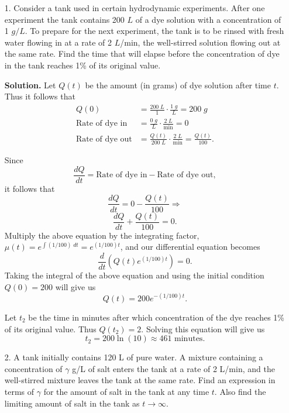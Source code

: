 \documentclass[9pt]{article}
\begin{document}
\begin{enumerate}
   \item[1.]   Consider a tank used in certain hydrodynamic experiments. After
               one experiment the tank contains 200 $L$ of a dye solution with a
               concentration of 1 $g/L$. To prepare for the next experiment, the  
               tank is to be rinsed with fresh water flowing in at a rate of 2
               $L$/min, the well-stirred solution flowing out at the same rate. 
               Find the time that will elapse before the concentration of dye in 
               the tank reaches 1\% of its original value.
               
      \textbf{Solution.} Let $Q(t)$ be the amount (in grams) of dye solution
      after time $t$. Thus it follows that
      \begin{align*}
         Q(0) &= \frac{200\;L}{1} \cdot \frac{1\;g}{L} = 200\;g \\
         \text{Rate of dye in}&=\frac{0\;g}{L}\cdot\frac{2\;L}{\text{min}}=0 \\
         \text{Rate of dye out}&=\frac{Q(t)}{200\;L}\cdot\frac{2\;L}{\text{min}}
            = \frac{Q(t)}{100}.
      \end{align*}
      
      Since
      $$\frac{dQ}{dt} = \text{Rate of dye in} - \text{Rate of dye out},$$
      it follows that
      $$\frac{dQ}{dt} = 0 - \frac{Q(t)}{100} \Rightarrow$$
      $$\frac{dQ}{dt} + \frac{Q(t)}{100} = 0.$$
      Multiply the above equation by the integrating factor,
      $\mu(t) = e^{\int(1/100)\;dt} = e^{(1/100)t}$, and our differential
      equation becomes
      $$\frac{d}{dt}\left(Q(t)e^{(1/100)t}\right) = 0.$$
      Taking the integral of the above equation and using the initial condition
      $Q(0) = 200$ will give us
      $$Q(t) = 200e^{-(1/100)t}.$$
      
      Let $t_2$ be the time in minutes after which concentration of the dye
      reaches 1\% of its original value. Thus $Q(t_2) = 2$. Solving this
      equation will give us
      $$t_2 = 200\ln(10) \approx 461 \text{ minutes}.$$
      
   \item[2.]   A tank initially contains 120 L of pure water. A mixture
               containing a concentration of $\gamma$ g/L of salt enters the
               tank at a rate of 2 L/min, and the well-stirred mixture leaves
               the tank at the same rate. Find an expression in terms of
               $\gamma$ for the amount of salt in the tank at any time $t$. Also
               find the limiting amount of salt in the tank as
               $t \rightarrow \infty$.
               

\end{enumerate}
\end{document}
